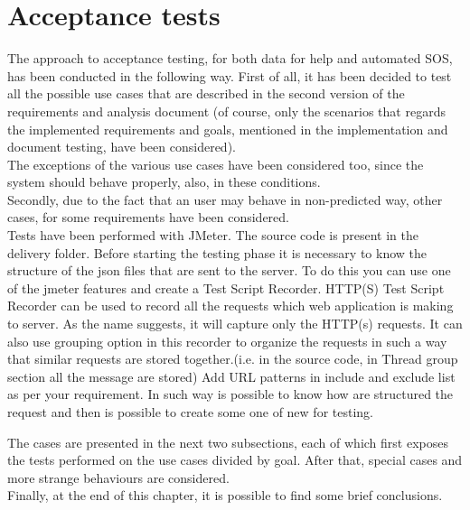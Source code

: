 \section{Acceptance tests}
The approach to acceptance testing, for both data for help and automated SOS, has been
conducted in the following way. 
First of all, it has been decided to test all the possible use cases that are described in the
second version of the requirements and analysis document (of course, only the scenarios that
regards the implemented requirements and goals, mentioned in the implementation and document testing, have been considered). \\
The exceptions of the various use cases have been considered too, since the system should
behave properly, also, in these conditions. \\
Secondly, due to the fact that an user may behave in non-predicted way, other cases, for some
requirements have been considered. \\

Tests have been performed with JMeter. The source code is present in the delivery folder. Before starting the testing phase it is necessary to know the structure of the json files that are sent to the server. To do this you can use one of the jmeter features and create a Test Script Recorder. HTTP(S) Test Script Recorder can be used to record all the requests which web application is making to server. As the name suggests, it will capture only the HTTP(s) requests. It can also use grouping option in this recorder to organize the requests in such a way that similar requests are stored together.(i.e. in the source code, in Thread group section all the message are stored) Add URL patterns in include and exclude list as per your requirement. In such way is possible to know how are structured the request and then is possible to create some one of new for testing.

\par
The cases are presented in the next two subsections, each of which first exposes the
tests performed on the use cases divided by goal. After that, special cases and more strange
behaviours are considered. \\
Finally, at the end of this chapter, it is possible to find some brief conclusions. 




